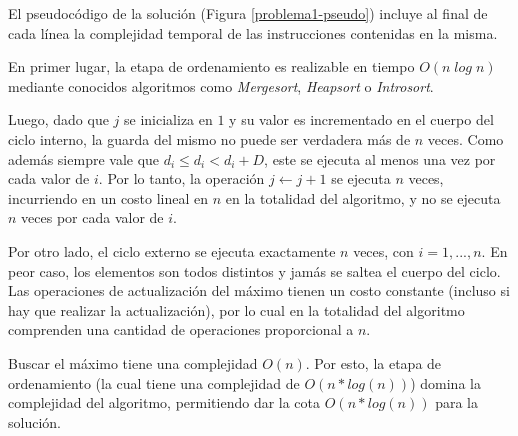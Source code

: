 El pseudocódigo de la solución (Figura \ref{problema1-pseudo}) incluye al final de cada línea la complejidad temporal de las instrucciones contenidas en la misma.

En primer lugar, la etapa de ordenamiento es realizable en tiempo $O(n\;log\;n)$ mediante conocidos algoritmos como \emph{Mergesort}, \emph{Heapsort} o \emph{Introsort}.

Luego, dado que $j$ se inicializa en $1$ y su valor es incrementado en el cuerpo del ciclo interno, la guarda del mismo no puede ser verdadera más de $n$ veces. Como además siempre vale que $d_i \leq d_i < d_i + D$, este se ejecuta al menos una vez por cada valor de $i$. Por lo tanto, la operación $j \leftarrow j + 1$ se ejecuta $n$ veces, incurriendo en un costo lineal en $n$ en la totalidad del algoritmo, y no se ejecuta $n$ veces por cada valor de $i$.

Por otro lado, el ciclo externo se ejecuta exactamente $n$ veces, con $i = 1, ..., n$. En peor caso, los elementos son todos distintos y jamás se saltea el cuerpo del ciclo. Las operaciones de actualización del máximo tienen un costo constante (incluso si hay que realizar la actualización), por lo cual en la totalidad del algoritmo comprenden una cantidad de operaciones proporcional a $n$.

Buscar el máximo tiene una complejidad $O(n)$. Por esto, la etapa de ordenamiento (la cual tiene una complejidad de $O(n*log(n))$) domina la complejidad del algoritmo, permitiendo dar la cota $O(n*log(n))$ para la solución.